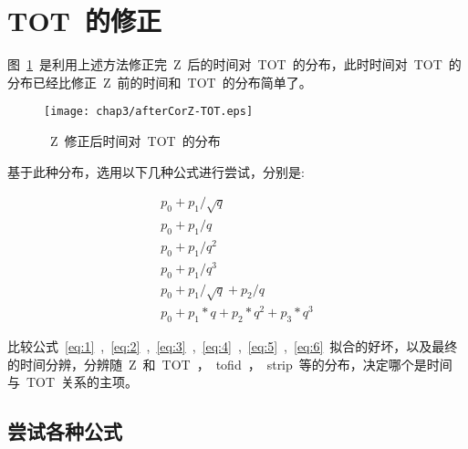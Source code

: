 \section{TOT~的修正}

图~\ref{fig:afterCorZ-TOT}~是利用上述方法修正完~Z~后的时间对~TOT~的分布，此时时间对~TOT~的分布已经比修正~Z~前的时间和~TOT~的分布简单了。

\begin{figure}[htbp]
\centering
\texttt{[image: chap3/afterCorZ-TOT.eps]}
\caption{~Z~修正后时间对~TOT~的分布}
\label{fig:afterCorZ-TOT}
\end{figure}

基于此种分布，选用以下几种公式进行尝试，分别是:

\begin{align}
p_{0}+p_{1}/\sqrt{q}
\label{eq:1}\\
p_{0}+p_{1}/q
\label{eq:2}\\
p_{0}+p_{1}/q^{2}
\label{eq:3}\\
p_{0}+p_{1}/q^{3}
\label{eq:4}\\
p_{0}+p_{1}/\sqrt{q}+p_{2}/q
\label{eq:5}\\
p_{0}+p_{1}*q+p_{2}*q^{2}+p_{3}*q^3
\label{eq:6}    
\end{align}

比较公式~\ref{eq:1}~,~\ref{eq:2}~,~\ref{eq:3}~,~\ref{eq:4}~,~\ref{eq:5}~,~\ref{eq:6}~拟合的好坏，以及最终的时间分辨，分辨随~Z~和~TOT~，~tofid~，~strip~等的分布，决定哪个是时间与~TOT~关系的主项。

\subsection{尝试各种公式}

